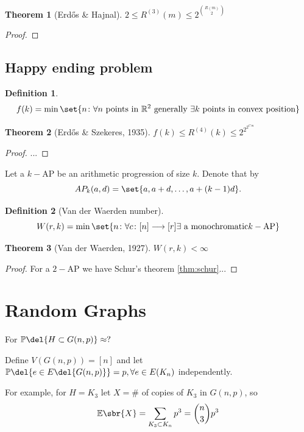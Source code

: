 \documentclass[english, dark, index]{Iart}
\newtheorem{theorem}{Theorem}[part]
\newtheorem{definition}{Definition}[part]
\begin{document}
	\begin{theorem}[Erdős \& Hajnal]
		$ 2\leqslant R^{(3)}(m)\leqslant 2^{\binom{R(m)}{2}} $
	\end{theorem}
	\begin{proof}
		
	\end{proof}
	
	\section{Happy ending problem}
	
	\begin{definition}
		\[ f(k)=\min\set{n\colon\forall n\textup{ points in }\mathbb{R}^{2} \textup{ generally }\exists k \textup{ points in convex position}} \]
	\end{definition}
	
	\begin{theorem}[Erdős \& Szekeres, 1935]
		$ f(k)\leqslant R^{(4)}(k)\leqslant 2^{2^{2^{C\,m}}} $
	\end{theorem}
	\begin{proof}
		...
	\end{proof}
	
	Let a $ k- $AP be an arithmetic progression of size $ k $. Denote that by
	\[ AP_k(a,d)=\set{a,a+d,\ldots,a+(k-1)d}. \]
	
	\begin{definition}[Van der Waerden number]
		\[ W(r,k)=\min\set{n\colon \forall c\colon [n]\longrightarrow [r]\exists \textup{ a monochromatic} k-\textup{AP}} \]
	\end{definition}
	
	\begin{theorem}[Van der Waerden, 1927]
		$ W(r,k)<\infty $
	\end{theorem}
	\begin{proof}
		For a $ 2- $AP we have Schur's theorem \ref{thm:schur}...
	\end{proof}

	\chapter{Random Graphs}
	
	For $ \mathbb{P}\del{H\subset G(n,p)}\approx ? $
	
	Define $ V(G(n,p))=[n] $ and let $ \mathbb{P}\del{e\in E\del{G(n,p)}}=p,\forall e\in E(K_n) $ independently.
	
	For example, for $ H=K_3 $ let $ X=\# $ of copies of $ K_3 $ in $ G(n,p) $, so
	\[ \mathbb{E}\sbr{X}=\sum_{K_3\subset K_n} p^{3}=\binom{n}{3}p^{3} \]
	
\end{document}
